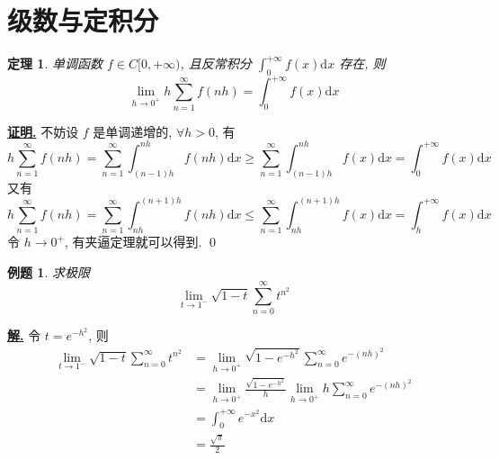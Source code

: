 \documentclass[10pt,a4paper]{book}
\theoremstyle{thmstyle} %
\newtheorem{theorem}{定理}[chapter]
\theoremstyle{defstyle} %
\theoremstyle{prostyle} %
\newtheorem{example}{例题}[chapter]
\renewenvironment{proof}[1][证明]{\par{\kaishu \uline{\textbf{#1.}}} \;\fangsong}{\qed\par}
\newenvironment{solution}{\par\underline{\textbf{解.}} \;\kaishu}{\par}
\begin{document}
	\section{级数与定积分}
	\begin{theorem}
		单调函数 $f\in C[0,+\infty)$, 且反常积分 $\displaystyle\int_{0}^{+\infty}f(x)\mathrm{d}x$ 存在, 则
		$$
		\lim\limits_{h\rightarrow 0^+}h\sum_{n=1}^{\infty}f(nh)=\int_{0}^{+\infty}f(x)\mathrm{d}x
		$$
	\end{theorem}
	\begin{proof}
		不妨设 $f$ 是单调递增的, $\forall h>0$, 有
		$$
		h\sum_{n=1}^{\infty}f(nh)=\sum_{n=1}^{\infty}\int_{(n-1)h}^{nh}f(nh)\mathrm{d}x\geqslant\sum_{n=1}^{\infty}\int_{(n-1)h}^{nh}f(x)\mathrm{d}x=\int_{0}^{+\infty}f(x)\mathrm{d}x
		$$
		又有
		$$
		h\sum_{n=1}^{\infty}f(nh)=\sum_{n=1}^{\infty}\int_{nh}^{(n+1)h}f(nh)\mathrm{d}x\leqslant\sum_{n=1}^{\infty}\int_{nh}^{(n+1)h}f(x)\mathrm{d}x=\int_{h}^{+\infty}f(x)\mathrm{d}x
		$$
		令 $h\rightarrow 0^+$, 有夹逼定理就可以得到.
	\end{proof}
	\begin{example}
		求极限
		$$
		\lim\limits_{t\rightarrow 1^-}\sqrt{1-t}\sum_{n=0}^{\infty}t^{n^2}
		$$
	\end{example}
	\begin{solution}
		令 $t=e^{-h^2}$, 则
		\begin{align*}
			\lim\limits_{t\rightarrow 1^-}\sqrt{1-t}\sum_{n=0}^{\infty}t^{n^2}&=\lim_{h\rightarrow 0^+} \sqrt{1-e^{-h^2}}\sum_{n=0}^{\infty}{e^{-\left( nh \right) ^2}}\\
			&=\lim_{h\rightarrow 0^+} \frac{\sqrt{1-e^{-h^2}}}{h}\lim_{h\rightarrow 0^+} h\sum_{n=0}^{\infty}{e^{-\left( nh \right) ^2}}\\
			&=\int_{0}^{+\infty}e^{-x^2}\mathrm{d}x\\
			&=\frac{\sqrt{\pi}}{2}			
		\end{align*}
		
	\end{solution}
\end{document}
